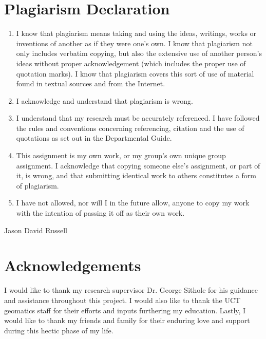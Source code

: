 \documentclass[11pt,a4paper]{report}
\begin{document}
\setcounter{page}{1}

\newpage
\chapter*{Plagiarism Declaration}
	\begin{enumerate}
		\item
			I know that plagiarism means taking and using the ideas, writings, works or inventions of another as if they were one's own. I know that plagiarism not only includes verbatim copying, but also the extensive use of another person's ideas without proper acknowledgement (which includes the proper use of quotation marks). I know that plagiarism covers this sort of use of material found in textual sources and from the Internet.
		\item
			I acknowledge and understand that plagiarism is wrong.
		\item
			I understand that my research must be accurately referenced. I have followed the rules and conventions concerning referencing, citation and the use of quotations as set out in the Departmental Guide.
		\item
			This assignment is my own work, or my group's own unique group assignment.
			I acknowledge that copying someone else's assignment, or part of it, is wrong, and that submitting identical work to others constitutes a form of plagiarism.
		\item
			I have not allowed, nor will I in the future allow, anyone to copy my work with the intention of passing it off as their own work.
	\end{enumerate}
	Jason David Russell

\newpage
\chapter*{Acknowledgements}
	I would like to thank my research supervisor Dr. George Sithole for his guidance and assistance throughout this project. I would also like to thank the UCT geomatics staff for their efforts and inputs furthering my education.
	Lastly, I would like to thank my friends and family for their enduring love and support during this hectic phase of my life.

\newpage
\end{document}
